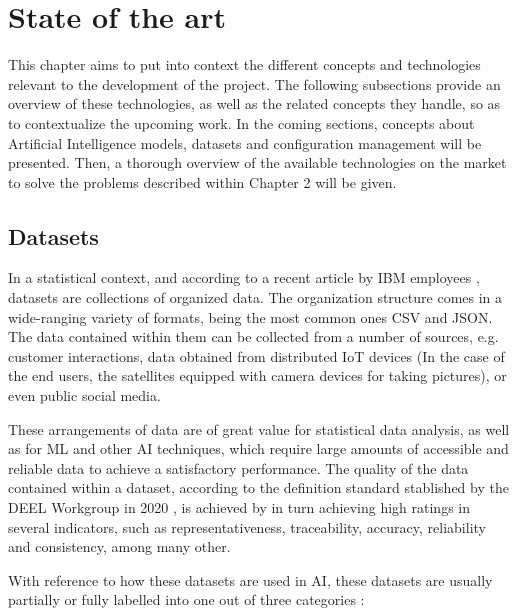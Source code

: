 \chapter{State of the art}\label{cap:StateOfTheArt}

This chapter aims to put into context the different concepts and technologies relevant to the development of the project. The following subsections provide an overview of
these technologies, as well as the related concepts they handle, so as to contextualize the upcoming work. In the coming sections, concepts about Artificial Intelligence 
models, datasets and configuration management will be presented. Then, a thorough overview of the available technologies on the market to solve the problems described 
within Chapter 2 will be given.

\section{Datasets}

In a statistical context, and according to a recent article by IBM employees \cite{DatasetIBM}, datasets are collections of organized data. The organization structure comes in
a wide-ranging variety of formats, being the most common ones \acrfull{CSV} and \acrfull{JSON}. The data contained within them can be collected from a number of sources, e.g.
customer interactions, data obtained from distributed IoT devices (In the case of the end users, the satellites equipped with camera devices for taking pictures), or even
public social media.

These arrangements of data are of great value for statistical data analysis, as well as for \acrfull{ML} and other \acrshort{AI} techniques, which require large amounts of
accessible and reliable data to achieve a satisfactory performance. The quality of the data contained within a dataset, according to the definition standard stablished by the
DEEL Workgroup in 2020 \cite{DDS}, is achieved by in turn achieving high ratings in several indicators, such as representativeness, traceability, accuracy, reliability and
consistency, among many other.

With reference to how these datasets are used in \acrlong{AI}, these datasets are usually partially or fully labelled into one out of three categories \cite{DDS}:

